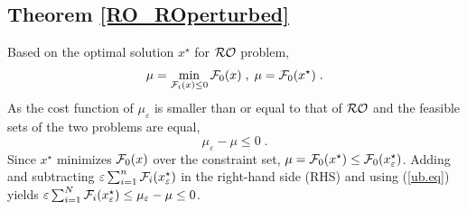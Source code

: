 \documentclass[journal,twoside,web]{ieeecolor}
\begin{document}
\subsection{Theorem \ref{RO_ROperturbed}}

Based on the optimal solution $x^\star$ for ${\cal RO}$ problem,
\begin{align*}
\mu=\min_{{\cal F}_i(x)\leq  0} {\cal F}_0(x)\;,\; \mu={\cal F}_0(x^\star)\;.
\end{align*}
As the cost function of $\mu_\varepsilon$ is smaller than or equal to that of ${\cal RO}$ and the feasible sets of the two problems are equal,
\begin{equation}\label{ub.eq}
 \mu_\varepsilon-\mu\leq 0\;.
\end{equation}
Since $x^\star$ minimizes ${\cal F}_0(x)$ over the constraint set, $\mu={\cal F}_0(x^\star)\leq {\cal F}_0(x_\varepsilon^\star)$.
Adding and subtracting $\varepsilon\sum_{i=1}^n{\cal F}_i(x^\star_\varepsilon)$
in the {\color{blue} right-hand side (RHS)} and using (\ref{ub.eq}) yields $\varepsilon \sum_{i=1}^N{\cal F}_{i}(x_\varepsilon^\star)\leq
\mu_\varepsilon-\mu\leq 0$\;.
\end{document}
